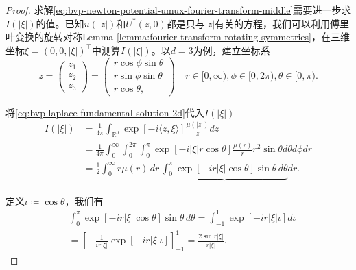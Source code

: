 \begin{proof}
求解\eqref{eq:bvp-newton-potential-umux-fourier-transform-middle}需要进一步求$I(|\xi|)$的值。已知$u(|z|)$和$U^*(z,0)$都是只与$|z|$有关的方程，我们可以利用傅里叶变换的旋转对称Lemma \ref{lemma:fourier-transform-rotating-symmetries}，在三维坐标$\xi = \left(0,0,|\xi| \right)^{\top}$中测算$I(|\xi|)$。以$d=3$为例，建立坐标系
\begin{equation*}
  z =
  \begin{pmatrix}
    z_1 \\ z_2 \\ z_3
  \end{pmatrix}
   = \begin{pmatrix}
   r \cos \phi \sin \theta \\
   r \sin \phi \sin \theta \\
   r \cos \theta,
   \end{pmatrix} \quad r \in [0, \infty), \phi \in [0, 2 \pi), \theta \in [0, \pi).
\end{equation*}

将\eqref{eq:bvp-laplace-fundamental-solution-2d}代入$I(|\xi|)$
\begin{equation*}
  \begin{split}
    I(|\xi|) &= \frac{1}{4 \pi}
    \int_{\mathbb{R}^d} \exp \left[ -i \langle z, \xi \rangle \right]
    \frac{\mu(|z|)}{|z|} dz \\
    &= \frac{1}{4 \pi}
    \int_{0}^{\infty}
    \int_{0}^{2 \pi}
    \int_{0}^{\pi}
    \exp \left[ -i |\xi| r \cos \theta \right]
    \frac{\mu(r)}{r}
    r^2 \sin \theta
    d \theta d \phi d r \\
    &= \frac{1}{2}
    \int_{0}^{\infty} r \mu(r) \, dr \,
    \underbrace{
    \int_{0}^{\pi}
    \exp \left[ -i r |\xi| \cos \theta \right]
    \sin \theta \,
    d \theta
    }_{}
    d r.
  \end{split}
\end{equation*}

定义$\iota \coloneqq \cos \theta$，我们有
\begin{equation*}
\begin{split}
  &\int_{0}^{\pi}
  \exp \left[ -i r |\xi| \cos \theta \right]
  \sin \theta \,
  d \theta =
  \int_{-1}^{1} \exp \left[ -i r |\xi| \iota \right] d \iota \\
  &=
  \left[
  - \frac{1}{i r |\xi|}
  \exp \left[ - i r |\xi| \iota \right]
  \right]_{-1}^{1} = \frac{2 \sin r |\xi|}{r |\xi|}.
\end{split}
\end{equation*}


\end{proof}
